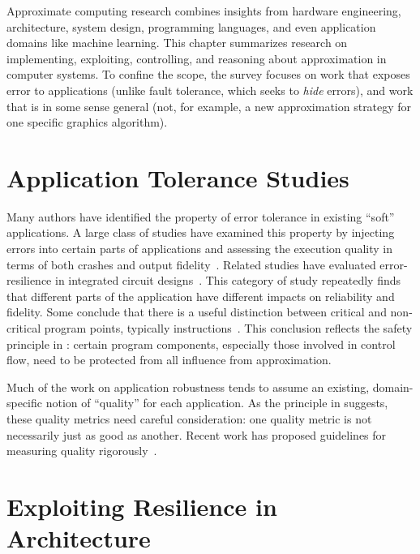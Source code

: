 Approximate computing research combines insights from hardware engineering,
architecture, system design, programming languages, and even application
domains like machine learning.
This chapter summarizes research on implementing, exploiting,
controlling, and reasoning about approximation in computer systems.
To confine the scope, the survey focuses on work that exposes error to
applications (unlike fault tolerance, which seeks to \emph{hide}
errors),
and work that is in some sense general (not, for example, a new approximation
strategy for one specific graphics algorithm).

\section{Application Tolerance Studies}
\label{sec:related:studies}

Many authors have identified the property of error tolerance in existing
``soft''
applications. A large class of studies have examined this property by
injecting errors into certain parts of applications and assessing the
execution quality in terms of both crashes and output fidelity~\cite{li06,
li07, li08, dekruijf-selse09, wong-selse06, palem-arcs, freton, besteffort,
yeh, thaker-iiswc06, efc, llfi, chippa-dac}.
Related
studies have evaluated error-resilience in
integrated circuit designs~\cite{breuer, scalable-effort-hardware}.
This category of study repeatedly finds that
different parts of the
application have different impacts on reliability and fidelity.
Some conclude
that there is a useful distinction between critical and non-critical program
points, typically instructions~\cite{palem-arcs, thaker-iiswc06, flikker,
llfi}.
This conclusion reflects
the safety principle in :
certain program components, especially those involved in control flow, need to
be protected from all influence from approximation.

Much of the work on application robustness tends to assume an existing,
domain-specific notion of ``quality'' for each
application.
As the principle in  suggests, these quality metrics
need careful consideration: one quality metric is not necessarily just as good
as another.
Recent work has proposed guidelines for measuring quality
rigorously~\cite{wddd-quality}.


\section{Exploiting Resilience in Architecture}

